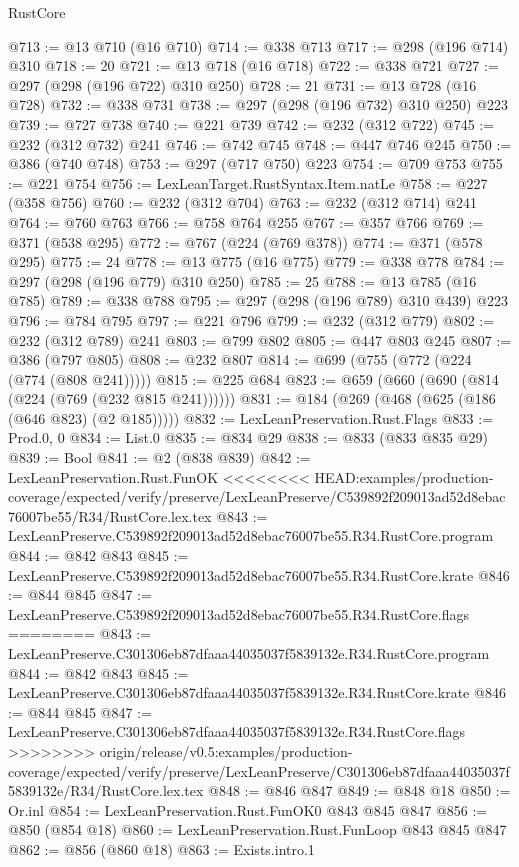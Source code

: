\begin{lexlean}{RustCore}
\begin{coremodule}
{\begin{coremodule}
{{{{{{{{@713 := @13 @710 (@16 @710)
@714 := @338 @713
@717 := @298 (@196 @714) @310
@718 := 20
@721 := @13 @718 (@16 @718)
@722 := @338 @721
@727 := @297 (@298 (@196 @722) @310 @250)
@728 := 21
@731 := @13 @728 (@16 @728)
@732 := @338 @731
@738 := @297 (@298 (@196 @732) @310 @250) @223
@739 := @727 @738
@740 := @221 @739
@742 := @232 (@312 @722)
@745 := @232 (@312 @732) @241
@746 := @742 @745
@748 := @447 @746 @245
@750 := @386 (@740 @748)
@753 := @297 (@717 @750) @223
@754 := @709 @753
@755 := @221 @754
@756 := LexLeanTarget.RustSyntax.Item.natLe
@758 := @227 (@358 @756)
@760 := @232 (@312 @704)
@763 := @232 (@312 @714) @241
@764 := @760 @763
@766 := @758 @764 @255
@767 := @357 @766
@769 := @371 (@538 @295)
@772 := @767 (@224 (@769 @378))
@774 := @371 (@578 @295)
@775 := 24
@778 := @13 @775 (@16 @775)
@779 := @338 @778
@784 := @297 (@298 (@196 @779) @310 @250)
@785 := 25
@788 := @13 @785 (@16 @785)
@789 := @338 @788
@795 := @297 (@298 (@196 @789) @310 @439) @223
@796 := @784 @795
@797 := @221 @796
@799 := @232 (@312 @779)
@802 := @232 (@312 @789) @241
@803 := @799 @802
@805 := @447 @803 @245
@807 := @386 (@797 @805)
@808 := @232 @807
@814 := @699 (@755 (@772 (@224 (@774 (@808 @241)))))
@815 := @225 @684
@823 := @659 (@660 (@690 (@814 (@224 (@769 (@232 @815 @241))))))
@831 := @184 (@269 (@468 (@625 (@186 (@646 @823) (@2 @185)))))
@832 := LexLeanPreservation.Rust.Flags
@833 := Prod.{0, 0}
@834 := List.{0}
@835 := @834 @29
@838 := @833 (@833 @835 @29)
@839 := Bool
@841 := @2 (@838 @839)
@842 := LexLeanPreservation.Rust.FunOK
<<<<<<<< HEAD:examples/production-coverage/expected/verify/preserve/LexLeanPreserve/C539892f209013ad52d8ebac76007be55/R34/RustCore.lex.tex
@843 := LexLeanPreserve.C539892f209013ad52d8ebac76007be55.R34.RustCore.program
@844 := @842 @843
@845 := LexLeanPreserve.C539892f209013ad52d8ebac76007be55.R34.RustCore.krate
@846 := @844 @845
@847 := LexLeanPreserve.C539892f209013ad52d8ebac76007be55.R34.RustCore.flags
========
@843 := LexLeanPreserve.C301306eb87dfaaa44035037f5839132e.R34.RustCore.program
@844 := @842 @843
@845 := LexLeanPreserve.C301306eb87dfaaa44035037f5839132e.R34.RustCore.krate
@846 := @844 @845
@847 := LexLeanPreserve.C301306eb87dfaaa44035037f5839132e.R34.RustCore.flags
>>>>>>>> origin/release/v0.5:examples/production-coverage/expected/verify/preserve/LexLeanPreserve/C301306eb87dfaaa44035037f5839132e/R34/RustCore.lex.tex
@848 := @846 @847
@849 := @848 @18
@850 := Or.inl
@854 := LexLeanPreservation.Rust.FunOK0 @843 @845 @847
@856 := @850 (@854 @18)
@860 := LexLeanPreservation.Rust.FunLoop @843 @845 @847
@862 := @856 (@860 @18)
@863 := Exists.intro.{1}
}}}}}}}}
\end{coremodule}}
\end{coremodule}
\end{lexlean}
